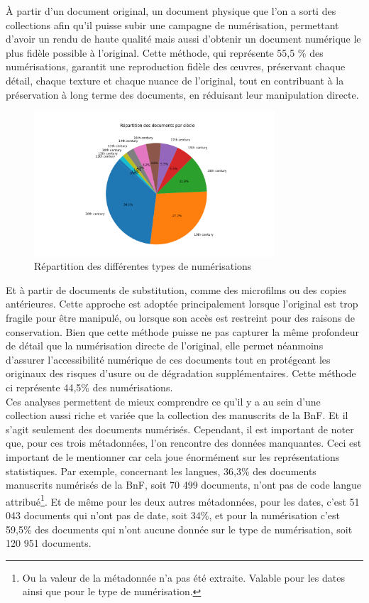 \documentclass[a4paper,12pt,twoside]{book}
\begin{document}
	À partir d’un document original, un document physique que l’on a sorti des collections afin qu’il puisse subir une campagne de numérisation, permettant d’avoir un rendu de haute qualité mais aussi d’obtenir un document numérique le plus fidèle possible à l’original. Cette méthode, qui représente 55,5 \% des numérisations, garantit une reproduction fidèle des œuvres, préservant chaque détail, chaque texture et chaque nuance de l’original, tout en contribuant à la préservation à long terme des documents, en réduisant leur manipulation directe.
	\begin{figure}[h!]
		\centering
		\includegraphics[width=0.8\textwidth]{images/siecle_mss_bnf.png}
		\caption{Répartition des différentes types de numérisations}
		\label{fig:monimage}
	\end{figure}
	Et à partir de documents de substitution, comme des microfilms ou des copies antérieures. Cette approche est adoptée principalement lorsque l’original est trop fragile pour être manipulé, ou lorsque son accès est restreint pour des raisons de conservation. Bien que cette méthode puisse ne pas capturer la même profondeur de détail que la numérisation directe de l’original, elle permet néanmoins d’assurer l’accessibilité numérique de ces documents tout en protégeant les originaux des risques d’usure ou de dégradation supplémentaires. Cette méthode ci représente 44,5\% des numérisations.
	\\
	
	Ces analyses permettent de mieux comprendre ce qu’il y a au sein d’une collection aussi riche et variée que la collection des manuscrits de la BnF. Et il s’agit seulement des documents numérisés. Cependant, il est important de noter que, pour ces trois métadonnées, l’on rencontre des données manquantes. Ceci est important de le mentionner car cela joue énormément sur les représentations statistiques. Par exemple, concernant les langues, 36,3\% des documents manuscrits numérisés de la BnF, soit 70 499 documents, n’ont pas de code langue attribué\footnote{Ou la valeur de la métadonnée n’a pas été extraite. Valable pour les dates ainsi que pour le type de numérisation.}. Et de même pour les deux autres métadonnées, pour les dates, c’est 51 043 documents qui n’ont pas de date, soit 34\%, et pour la numérisation c’est 59,5\% des documents qui n’ont aucune donnée sur le type de numérisation, soit 120 951 documents. 
	
\end{document}
